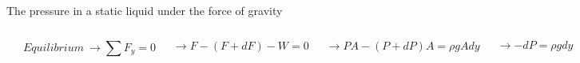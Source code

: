 \documentclass[]{beamer}
\begin{document}
\begin{frame}

  \textcolor{mypink1}{The pressure in a static liquid under the force of gravity}

\pause
  \begin{columns}[c]
    \column{2in}  %
 
      \begin{center}
        \includegraphics[height=1.3in]{images2/Feiman_2b.png}
      \end{center}

      
\pause

    \column{2.6in}
 
      \begin{equation*}
        Equilibrium \ \rightarrow \sum F_y=0
      \end{equation*}

      \pause
      \begin{equation*}
        \rightarrow F -(F+dF)-W=0
      \end{equation*}

   

\pause

      \begin{equation*}
        \rightarrow PA-(P+dP)A=\rho g A dy
      \end{equation*}

      \pause

      \begin{equation}
        \rightarrow -dP=\rho g  dy 
      \end{equation}
    

    \end{columns}

\end{frame}
\end{document}
